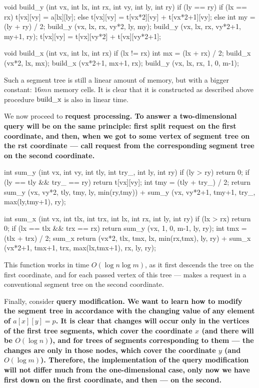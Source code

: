\code
void build_y (int vx, int lx, int rx, int vy, int ly, int ry) {
if (ly == ry)
if (lx == rx)
t[vx][vy] = a[lx][ly];
else
t[vx][vy] = t[vx*2][vy] + t[vx*2+1][vy];
else {
int my = (ly + ry) / 2;
build_y (vx, lx, rx, vy*2, ly, my);
build_y (vx, lx, rx, vy*2+1, my+1, ry);
t[vx][vy] = t[vx][vy*2] + t[vx][vy*2+1];
}
}

void build_x (int vx, int lx, int rx) {
if (lx != rx) {
int mx = (lx + rx) / 2;
build_x (vx*2, lx, mx);
build_x (vx*2+1, mx+1, rx);
}
build_y (vx, lx, rx, 1, 0, m-1);
}
\endcode

Such a segment tree is still a linear amount of memory, but with a bigger constant: $16 m n$ memory cells. It is clear that it is constructed as described above procedure $\rm build\_x$ is also in linear time.

We now proceed to \bf{request processing}. To answer a two-dimensional query will be on the same principle: first split request on the first coordinate, and then, when we got to some vertex of segment tree on the rst coordinate --- call request from the corresponding segment tree on the second coordinate.

\code
int sum_y (int vx, int vy, int tly, int try_, int ly, int ry) {
if (ly > ry)
return 0;
if (ly == tly && try_ == ry)
return t[vx][vy];
int tmy = (tly + try_) / 2;
return sum_y (vx, vy*2, tly, tmy, ly, min(ry,tmy))
+ sum_y (vx, vy*2+1, tmy+1, try_, max(ly,tmy+1), ry);
}

int sum_x (int vx, int tlx, int trx, int lx, int rx, int ly, int ry) {
if (lx > rx)
return 0;
if (lx == tlx && trx == rx)
return sum_y (vx, 1, 0, m-1, ly, ry);
int tmx = (tlx + trx) / 2;
sum_x return (vx*2, tlx, tmx, lx, min(rx,tmx), ly, ry)
+ sum_x (vx*2+1, tmx+1, trx, max(lx,tmx+1), rx, ly, ry);
}
\endcode

This function works in time $O (\log n \log m)$, as it first descends the tree on the first coordinate, and for each passed vertex of this tree --- makes a request in a conventional segment tree on the second coordinate.

Finally, consider \bf{query modification}. We want to learn how to modify the segment tree in accordance with the changing value of any element of $a[x][y] = p$. It is clear that changes will occur only in the vertices of the first tree segments, which cover the coordinate $x$ (and there will be $O (\log n)$), and for trees of segments corresponding to them --- the changes are only in those nodes, which cover the coordinate $y$ (and $O (\log m)$). Therefore, the implementation of the query modification will not differ much from the one-dimensional case, only now we have first down on the first coordinate, and then --- on the second.

